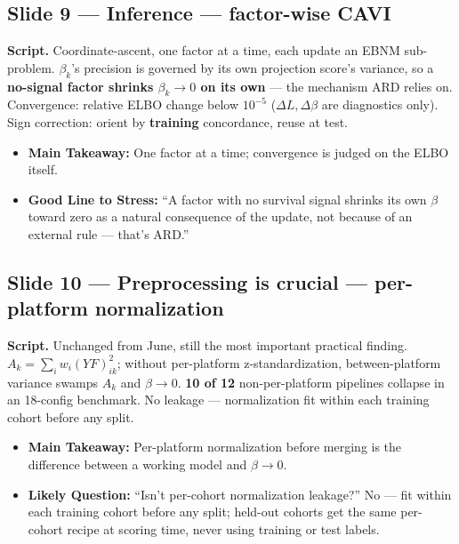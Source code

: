\documentclass[11pt]{article}
\newcommand{\scriptlabel}{\textbf{Script. }}
\newcommand{\sectionlabel}[1]{\textbf{#1}}
\newcommand{\key}[1]{\textcolor{keyblue}{\textbf{#1}}}        %
\begin{document}
\subsection*{Slide 9 --- Inference --- factor-wise CAVI}
\scriptlabel Coordinate-ascent, one factor at a time, each update an EBNM sub-problem. $\beta_k$'s
precision is governed by its own projection score's variance, so a \key{no-signal factor shrinks
$\beta_k \to 0$ on its own} --- the mechanism ARD relies on. Convergence: relative ELBO change below
$10^{-5}$ ($\Delta L,\Delta\beta$ are diagnostics only). Sign correction: orient by \key{training}
concordance, reuse at test.

\begin{itemize}
\item \sectionlabel{Main Takeaway:} One factor at a time; convergence is judged on the ELBO itself.
\item \sectionlabel{Good Line to Stress:} ``A factor with no survival signal shrinks its own $\beta$
toward zero as a natural consequence of the update, not because of an external rule --- that's ARD.''
\end{itemize}

\subsection*{Slide 10 --- Preprocessing is crucial --- per-platform normalization}
\scriptlabel Unchanged from June, still the most important practical finding. $A_k = \sum_i w_i
(YF)_{ik}^2$; without per-platform z-standardization, between-platform variance swamps $A_k$ and
$\beta \to 0$. \key{10 of 12} non-per-platform pipelines collapse in an 18-config benchmark. No
leakage --- normalization fit within each training cohort before any split.

\begin{itemize}
\item \sectionlabel{Main Takeaway:} Per-platform normalization before merging is the difference
between a working model and $\beta \to 0$.
\item \sectionlabel{Likely Question:} ``Isn't per-cohort normalization leakage?'' No --- fit within
each training cohort before any split; held-out cohorts get the same per-cohort recipe at scoring
time, never using training or test labels.
\end{itemize}
\end{document}
